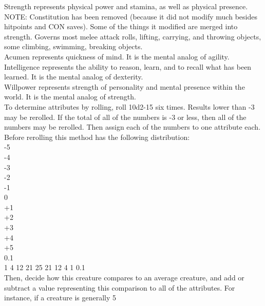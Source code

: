 \documentclass[letterpaper,titlepage,openany,twocolumn]{book}
\begin{document}
Strength represents physical power and stamina, as well as physical presence. NOTE: Constitution has been removed (because it did not modify much besides hitpoints and CON saves). Some of the things it modified are merged into strength. Governs most melee attack rolls, lifting, carrying, and throwing objects, some climbing, swimming, breaking objects.\\

Acumen represents quickness of mind. It is the mental analog of agility.\\

Intelligence represents the ability to reason, learn, and to recall what has been learned. It is the mental analog of dexterity.\\

Willpower represents strength of personality and mental presence within the world. It is the mental analog of strength.\\

To determine attributes by rolling, roll 10d2-15 six times. Results lower than -3 may be rerolled. If the total of all of the numbers is -3 or less, then all of the numbers may be rerolled. Then assign each of the numbers to one attribute each. Before rerolling this method has the following distribution:\\
-5\\
-4\\
-3\\
-2\\
-1\\
0\\
+1\\
+2\\
+3\\
+4\\
+5\\
0.1\\
1%
4%
12%
21%
25%
21%
12%
4%
1%
0.1\\

Then, decide how this creature compares to an average creature, and add or subtract a value representing this comparison to all of the attributes. For instance, if a creature is generally 5%
\end{document}
